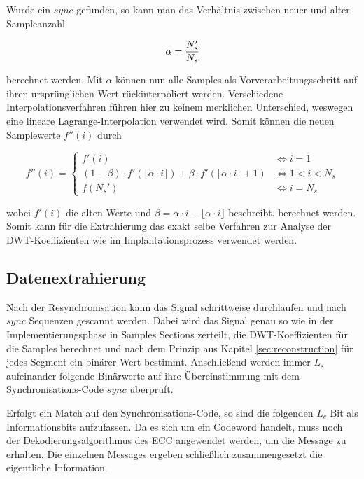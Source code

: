 Wurde ein $sync$ gefunden, so kann man das Verhältnis zwischen neuer und alter Sampleanzahl

	\begin{equation}
		\alpha = { {N}_{s}' \over {N}_{s} }
		\label{equ:resampling_factor}
	\end{equation}

berechnet werden. Mit $\alpha$ können nun alle Samples als Vorverarbeitungsschritt auf ihren ursprünglichen Wert rückinterpoliert werden. Verschiedene Interpolationsverfahren führen hier zu keinem merklichen Unterschied\cite{xiang2007robust}, weswegen eine lineare Lagrange-Interpolation verwendet wird. Somit können die neuen Samplewerte $f''(i)$ durch

	\begin{equation}
		f''(i) = \begin{cases}
    	 	f'(i) & \iff i = 1	
			\\
			(1-\beta) \cdot f'(\lfloor\alpha \cdot i\rfloor) + \beta \cdot f'(\lfloor\alpha \cdot i\rfloor + 1) & \iff 1 < i < {N}_{s} 
			\\
    		f({N}_{s}') & \iff i = {N}_{s}
  		 \end{cases}
		\label{equ:lagrange_interpolation}
	\end{equation}
	
wobei $f'(i)$ die alten Werte und $\beta = \alpha \cdot i - \lfloor \alpha \cdot i \rfloor$ beschreibt, berechnet werden. Somit kann für die Extrahierung das exakt selbe Verfahren zur Analyse der DWT-Koeffizienten wie im Implantationsprozess verwendet werden. 

\subsection{Datenextrahierung}

Nach der Resynchronisation kann das Signal schrittweise durchlaufen und nach $sync$ Sequenzen gescannt werden. Dabei wird das Signal genau so wie in der Implementierungsphase in Samples Sections zerteilt, die DWT-Koeffizienten für die Samples berechnet und nach dem Prinzip aus Kapitel \ref{sec:reconstruction} für jedes Segment ein binärer Wert bestimmt. Anschließend werden immer $L_s$ aufeinander folgende Binärwerte auf ihre Übereinstimmung mit dem Synchronisations-Code $sync$ überprüft.

Erfolgt ein Match auf den Synchronisations-Code, so sind die folgenden $L_c$ Bit als Informationsbits aufzufassen. Da es sich um ein Codeword handelt, muss noch der Dekodierungsalgorithmus des ECC angewendet werden, um die Message zu erhalten. Die einzelnen Messages ergeben schließlich zusammengesetzt die eigentliche Information. 


